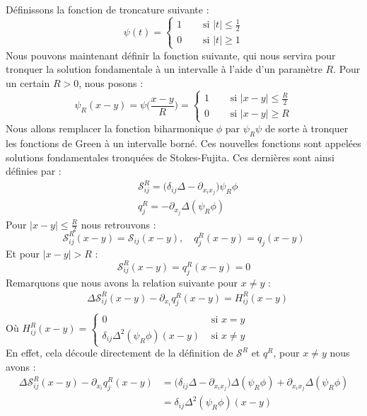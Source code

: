 Définissons la fonction de troncature suivante :
$$ \psi (t) = \begin{cases}
    1 \quad &\text{ si } |t| \leq \frac{1}{2}\\
    0 &\text{ si } |t| \geq 1
\end{cases} $$
Nous pouvons maintenant définir la fonction suivante, qui nous servira pour tronquer la solution fondamentale à un intervalle à l'aide d'un paramètre $R$. Pour un certain $R > 0$, nous posons :
$$\psi_R (x - y) = \psi\bigg(\frac{x - y}{R}\bigg) = \begin{cases}
    1 \quad &\text{ si } |x-y| \leq \frac{R}{2} \\
    0 &\text{ si } |x-y| \geq R
\end{cases} $$
Nous allons remplacer la fonction biharmonique $\phi$ par $\psi_R \psi$ de sorte à tronquer les fonctions de Green à un intervalle borné. Ces nouvelles fonctions sont appelées solutions fondamentales tronquées de Stokes-Fujita.
Ces dernières sont ainsi définies par :
\begin{align*}
    & \mathscr{S}_{ij}^R = \Big(\delta_{ij}\Delta - \partial_{x_i x_j} \Big)\psi_R\phi \\
    & q_j^R = - \partial_{x_j}\Delta(\psi_R\phi)
\end{align*}
Pour $|x-y| \leq \frac{R}{2}$ nous retrouvons :
$$ \mathscr{S}_{ij}^R(x-y) = \mathscr{S}_{ij}(x-y), \quad q_j^R(x-y) = q_j(x-y) $$
Et pour $|x-y|>R$ :
$$ \mathscr{S}_{ij}^R(x-y) = q_j^R(x-y) = 0 $$
Remarquons que nous avons la relation suivante pour $x \neq y$ :
\begin{align*}
    &\Delta \mathscr{S}_{ij}^R(x-y) - \partial_{x_i}q_j^R(x-y) = H_{ij}^R(x-y) \\
\end{align*}
Où $H_{ij}^R(x-y) = \begin{cases}
    0 \quad &\text{ si } x = y \\
    \delta_{ij}\Delta^2(\psi_R\phi)(x-y) &\text{ si } x \neq y
\end{cases} $\\
En effet, cela découle directement de la définition de $\mathscr{S}^R$ et $q^R$, pour $x \neq y$ nous avons : 
\begin{align*}
    \Delta \mathscr{S}_{ij}^R(x-y) - \partial_{x_i}q_j^R(x-y) &= \big( \delta_{ij}\Delta - \partial_{x_i x_j} \big)\Delta(\psi_R \phi) + \partial_{x_i x_j} \Delta(\psi_R \phi) \\
    &= \delta_{ij}\Delta^2(\psi_R \phi)(x-y)
\end{align*}
